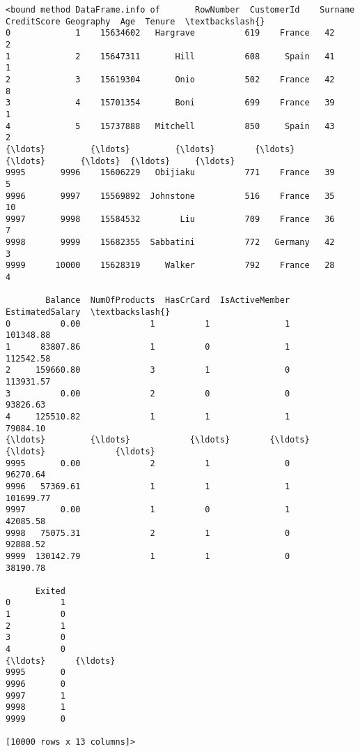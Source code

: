 \documentclass[11pt]{article}
\makeatletter
\newcommand{\boxspacing}{\kern\kvtcb@left@rule\kern\kvtcb@boxsep}
\newcommand{\prompt}[4]{
        {\ttfamily\llap{{\color{#2}[#3]:\hspace{3pt}#4}}\vspace{-\baselineskip}}
    }
\makeatother
\begin{document}
            \begin{tcolorbox}[breakable, size=fbox, boxrule=.5pt, pad at break*=1mm, opacityfill=0]
\prompt{Out}{outcolor}{56}{\boxspacing}
\begin{Verbatim}[commandchars=\\\{\}]
<bound method DataFrame.info of       RowNumber  CustomerId    Surname
CreditScore Geography  Age  Tenure  \textbackslash{}
0             1    15634602   Hargrave          619    France   42       2
1             2    15647311       Hill          608     Spain   41       1
2             3    15619304       Onio          502    France   42       8
3             4    15701354       Boni          699    France   39       1
4             5    15737888   Mitchell          850     Spain   43       2
{\ldots}         {\ldots}         {\ldots}        {\ldots}          {\ldots}       {\ldots}  {\ldots}     {\ldots}
9995       9996    15606229   Obijiaku          771    France   39       5
9996       9997    15569892  Johnstone          516    France   35      10
9997       9998    15584532        Liu          709    France   36       7
9998       9999    15682355  Sabbatini          772   Germany   42       3
9999      10000    15628319     Walker          792    France   28       4

        Balance  NumOfProducts  HasCrCard  IsActiveMember  EstimatedSalary  \textbackslash{}
0          0.00              1          1               1        101348.88
1      83807.86              1          0               1        112542.58
2     159660.80              3          1               0        113931.57
3          0.00              2          0               0         93826.63
4     125510.82              1          1               1         79084.10
{\ldots}         {\ldots}            {\ldots}        {\ldots}             {\ldots}              {\ldots}
9995       0.00              2          1               0         96270.64
9996   57369.61              1          1               1        101699.77
9997       0.00              1          0               1         42085.58
9998   75075.31              2          1               0         92888.52
9999  130142.79              1          1               0         38190.78

      Exited
0          1
1          0
2          1
3          0
4          0
{\ldots}      {\ldots}
9995       0
9996       0
9997       1
9998       1
9999       0

[10000 rows x 13 columns]>
\end{Verbatim}
\end{tcolorbox}
        
\end{document}
